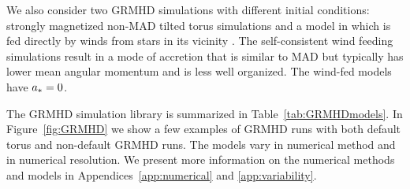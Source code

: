 We also consider two GRMHD simulations with different initial conditions: strongly magnetized non-MAD tilted torus simulations \citep{Liska2018, Chatterjee2020} and a model in which \sgra is fed directly by winds from stars in its vicinity \citep{2020ApJ...896L...6R}.
The self-consistent wind feeding simulations result in a mode of accretion that is similar to MAD but typically has lower mean angular momentum and is less well organized.
The wind-fed models have $a_* = 0$.

The GRMHD simulation library is summarized in Table~\ref{tab:GRMHDmodels}.
In Figure~\ref{fig:GRMHD} we show a few examples of GRMHD runs with both default torus and non-default GRMHD runs.
The models vary in numerical method and in numerical resolution. We present more information on the numerical methods and models in Appendices~\ref{app:numerical} and \ref{app:variability}.

